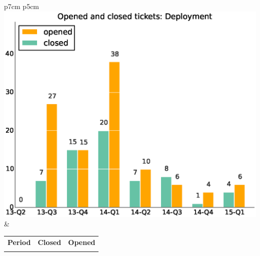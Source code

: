 \documentclass[a4wide,11pt]{article}
\begin{document}
\begin{tabular}{p{7cm} p{5cm}}
    \vspace{0pt} 
    \includegraphics[scale=.35]{figs/closedDeployment.eps}
    & 
    \vspace{0pt}
    \begin{tabular}{l|r|r|}%
\bfseries Period & \bfseries Closed & \bfseries Opened
    \csvreader[head to column names]{data/closedDeployment.csv}{}%
    {\\ & \closed & \opened}
    \end{tabular}
\end{tabular}
\end{document}
